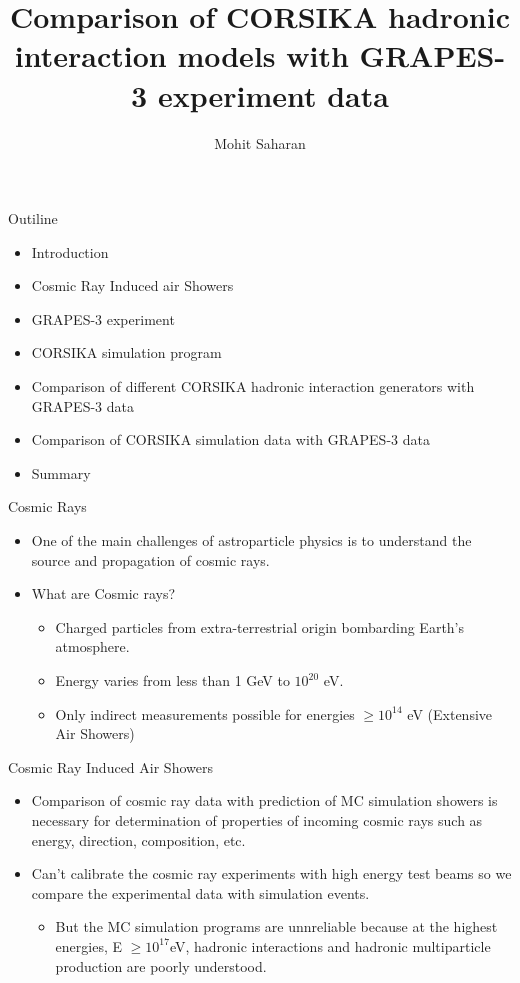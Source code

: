 \documentclass{beamer}
\title{Comparison of CORSIKA hadronic interaction models with GRAPES-3 experiment data}
\author{Mohit Saharan}
\institute{GRAPES-3 Interaction Meeting}
\begin{document}
\frame{\titlepage}


\begin{frame}{Outiline}
\begin{itemize}
    \item Introduction
    \item Cosmic Ray Induced air Showers
    \item GRAPES-3 experiment
    \item CORSIKA simulation program
    \item Comparison of different CORSIKA hadronic interaction generators with GRAPES-3 data
    \item Comparison of CORSIKA simulation data with GRAPES-3 data
    \item Summary
\end{itemize}
\end{frame}


\begin{frame}{Cosmic Rays}
\begin{itemize}
    \item One of the main challenges of astroparticle physics is to understand the source and propagation of cosmic rays.	
    \item What are Cosmic rays?
    \begin{itemize}
    	\item Charged particles from extra-terrestrial origin bombarding Earth’s atmosphere.
    	\item Energy varies from less than 1 GeV to $10^{20}$ eV.
    	\item Only indirect measurements possible for energies $\geq10^{14}$ eV (Extensive Air Showers)
    \end{itemize}
     	
\end{itemize}
\end{frame}


\begin{frame}{Cosmic Ray Induced Air Showers}
	\begin{itemize}
	
	    \item Comparison of cosmic ray data with prediction of MC simulation showers is necessary for determination of properties of incoming cosmic rays such as energy, direction, composition, etc.   
		\item Can't calibrate the cosmic ray experiments with high energy test beams so we compare the experimental data with simulation events.
			\begin{itemize}
				\item But the MC simulation programs are unnreliable because at the highest energies, E $\geq10^{17}$eV, hadronic interactions and hadronic multiparticle production are poorly understood.
			\end{itemize}
		
	\end{itemize}
\end{frame}
\end{document}
